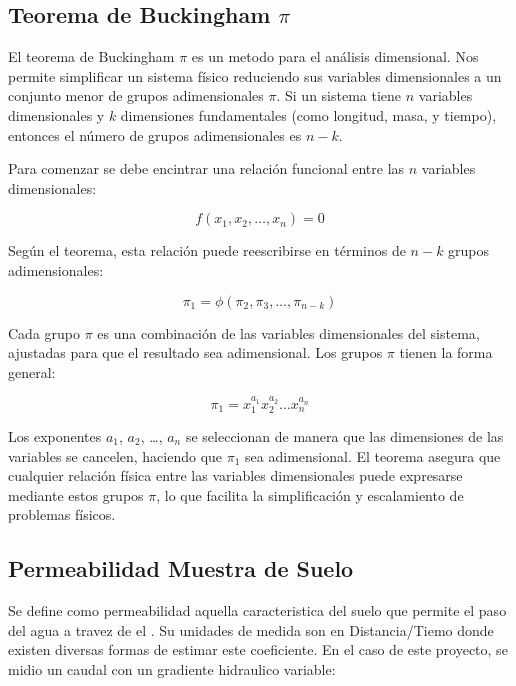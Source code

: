 \subsection{Teorema de Buckingham $\pi$}

El teorema de Buckingham $\pi$ es un metodo para el análisis dimensional. Nos permite simplificar un sistema físico reduciendo sus variables dimensionales a un conjunto menor de grupos adimensionales $\pi$. Si un sistema tiene $n$ variables dimensionales y $k$ dimensiones fundamentales (como longitud, masa, y tiempo), entonces el número de grupos adimensionales es $n - k$.

Para comenzar se debe encintrar una relación funcional entre las $n$ variables dimensionales:

\begin{equation}
f(x_1, x_2, \ldots, x_n) = 0
\end{equation}

Según el teorema, esta relación puede reescribirse en términos de $n - k$ grupos adimensionales:

\begin{equation}
\pi_1 = \phi(\pi_2, \pi_3, \ldots, \pi_{n-k})
\end{equation}

Cada grupo $\pi$ es una combinación de las variables dimensionales del sistema, ajustadas para que el resultado sea adimensional. Los grupos $\pi$ tienen la forma general:

\begin{equation}
\pi_1 = x_1^{a_1} x_2^{a_2} \ldots x_n^{a_n}
\end{equation}

Los exponentes $a_1$, $a_2$, \ldots, $a_n$ se seleccionan de manera que las dimensiones de las variables se cancelen, haciendo que $\pi_1$ sea adimensional. El teorema asegura que cualquier relación física entre las variables dimensionales puede expresarse mediante estos grupos $\pi$, lo que facilita la simplificación y escalamiento de problemas físicos.

\subsection{Permeabilidad Muestra de Suelo}

Se define como permeabilidad aquella caracteristica del suelo que permite el paso del agua a travez de el \textbf{\cite{permeabilidad_suelos}}. Su unidades de medida son en Distancia/Tiemo donde existen diversas formas de estimar este coeficiente. En el caso de este proyecto, se midio un caudal con un gradiente hidraulico variable:

